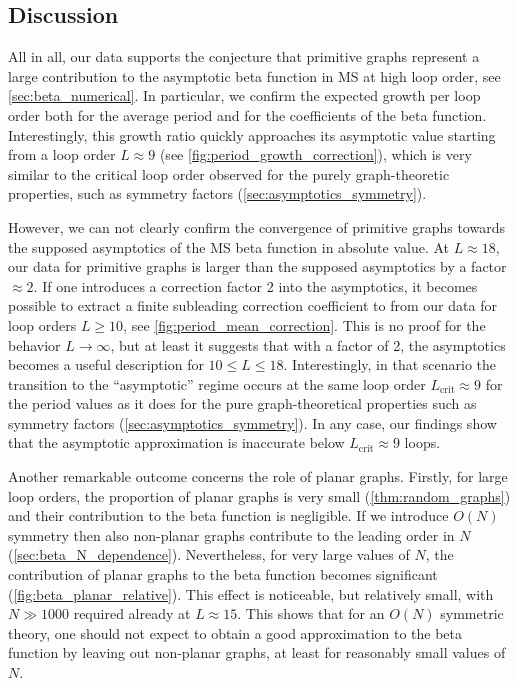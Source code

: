 \documentclass[11pt,a4paper]{article}
\renewcommand{\|}{\rule[-0.4ex]{0.2ex}{1.2em}}
\begin{document}
\subsection{Discussion}\label{sec:discussion}





All in all, our data supports the conjecture that primitive graphs represent a large contribution to the asymptotic beta function in MS at high loop order, see \cref{sec:beta_numerical}. In particular, we confirm the expected growth per loop order both for the average period and for the coefficients of the beta function.   
Interestingly, this growth ratio quickly approaches its asymptotic value starting from a loop order $L \approx 9$ (see \cref{fig:period_growth_correction}), which is very similar to the critical loop order observed for the   purely graph-theoretic properties, such as symmetry factors (\cref{sec:asymptotics_symmetry}). 

However, we can not clearly confirm the convergence of primitive graphs towards the supposed asymptotics of the MS beta function in absolute value. At $L \approx 18$, our data for primitive graphs is larger than the supposed asymptotics by a factor $\approx 2$. If one introduces a correction factor 2 into the asymptotics, it becomes possible to extract a finite subleading correction coefficient to from our data  for loop orders $L \geq 10$, see \cref{fig:period_mean_correction}. This is no proof for the behavior $L \rightarrow \infty$, but at least it suggests that with a factor of 2, the asymptotics becomes a useful description for $10 \leq L \leq 18$. Interestingly, in that scenario the transition to the \enquote{asymptotic} regime occurs at the same loop order $L_\text{crit}\approx 9$ for the period values as it does for the pure graph-theoretical properties such as symmetry factors (\cref{sec:asymptotics_symmetry}). In any case, our findings show that the asymptotic approximation is inaccurate below $L_\text{crit}\approx 9$ loops.


Another remarkable outcome concerns the  role of planar graphs. Firstly, for large loop orders, the proportion of planar graphs is very small (\cref{thm:random_graphs}) and their contribution to the beta function is negligible. If we introduce $O(N)$ symmetry then also non-planar graphs contribute to the leading order in $N$ (\cref{sec:beta_N_dependence}).  Nevertheless, for very large values of $N$, the contribution of planar graphs to the beta function becomes significant (\cref{fig:beta_planar_relative}). This effect is noticeable, but relatively small,  with $N \gg 1000$ required already at $L \approx 15$. This shows that for an $O(N)$ symmetric theory, one should not expect to obtain a good approximation to the beta function by leaving out non-planar graphs, at least for reasonably small values of $N$. 
\end{document}
